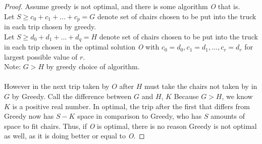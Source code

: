 \documentclass[11pt]{article}
\begin{document}
	\begin{proof}
		Assume greedy is not optimal, and there is some algorithm \textit{O} that is.\\
		Let $S \geq c_0 + c_1 +  . . . + c_p = G$ denote set of chairs chosen to be put into the truck in each trip chosen by greedy.\\
		Let $S \geq d_0 + d_1 +  . . . + d_q = H$ denote set of chairs chosen to be put into the truck in each trip chosen in the optimal solution \textit{O} with $c_0 = d_0, c_1= d_1 , . . . , c_r= d_r$ for largest possible value of $r$.\\
		Note: $G > H$ by greedy choice of algorithm. \\
		\\
		However in the next trip taken by $O$ after $H$ must take the chairs not taken by in $G$ by Greedy. Call the difference between $G$ and $H$, $K$ Because $G > H$, we know $K$ is a positive real number. In optimal, the trip after the first that differs from Greedy now has $S-K$ space in comparison to Greedy, who has $S$ amounts of space to fit chairs. Thus, if \textit{O} is optimal, there is no reason Greedy is not optimal as well, as it is doing better or equal to \textit{O}.
		
		
	\end{proof}

	\newpage
	
	
\end{document}

